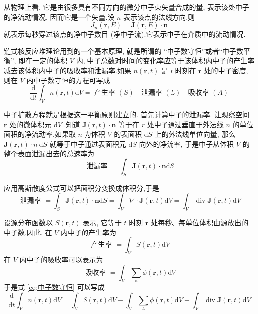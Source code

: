 \documentclass{Sichuan Normal University}
\begin{document}
从物理上看, 它是由很多具有不同方向的微分中子束矢量合成的量, 表示该处中子的净流动情况, 因而它是一个矢量.设 $n$ 表示该点的法线方向,则
\begin{equation}
    J_n(\boldsymbol{r}, E)=\boldsymbol{J}(\boldsymbol{r}, E) \cdot \boldsymbol{n}
    \label{eq:中子的净流密度2}
\end{equation}
就表示每秒穿过该点的净中子数目 (净中子流).它表示中子在介质中的流动情况.

链式核反应堆理论用到的一个基本原理, 就是所谓的 “中子数守恒”或者“中子数平衡”, 即在一定的体积 $V$ 内, 中子总数对时间的变化率应等于该体积内中子的产生率减去该体积内中子的吸收率和泄漏率.如果 $n(\boldsymbol{r}, t)$ 是 $t$ 时刻在 $\boldsymbol{r}$ 处的中子密度, 则在 $V$ 内中子数守恒的方程可写成
\begin{equation}
    \frac{\mathrm{d}}{\mathrm{d} t} \int_V n(\boldsymbol{r}, t) \mathrm{d} V=\text { 产生率 }(S) \text { - 泄漏率 }(L) \text { - 吸收率 }(A)
    \label{eq:中子数守恒}
\end{equation}

中子扩散方程就是根据这一平衡原则建立的.
首先计算中子的泄漏率.
让观察空间 $\boldsymbol{r}$ 处的微体积元 $\mathrm{d} V$ .知道 $\boldsymbol{J}(\boldsymbol{r}, t) \cdot \boldsymbol{n}$ 等于在 $r$ 处中子通过垂直于外法线 $n$ 的单位面积的净流动率.如果取 $n$ 为体积 $V$ 的表面积 $\mathrm{d} S$ 上的外法线单位向量, 那么 $\boldsymbol{J}(\boldsymbol{r}, t) \cdot n \mathrm{~d} S$ 就等于中子通过表面积元 $\mathrm{d} S$ 向外的净流率, 于是中子从体积 $V$ 的整个表面泄漏出去的总速率为
\begin{equation}
    \text { 泄漏率 }=\int_S \boldsymbol{J}(\boldsymbol{r}, t) \cdot \boldsymbol{n} \mathrm{d} S
    \label{eq:泄漏率}
\end{equation}

应用高斯散度公式可以把面积分变换成体积分,于是
\begin{equation}
    \text { 泄漏率 }=\int_S \boldsymbol{J}(\boldsymbol{r}, t) \cdot \boldsymbol{n} \mathrm{d} S=\int_V \nabla \cdot \boldsymbol{J}(\boldsymbol{r}, t) \mathrm{d} V=\int_V \operatorname{div} \boldsymbol{J}(\boldsymbol{r}, t) \mathrm{d} V
    \label{eq:泄漏率2}
\end{equation}

设源分布函数以 $S(\boldsymbol{r}, t)$ 表示, 它等于 $t$ 时刻 $\boldsymbol{r}$ 处每秒、每单位体积由源放出的中子数.因此, 在 $V$ 内中子的产生率为
\begin{equation}
    \text { 产生率 }=\int_V S(\boldsymbol{r}, t) \mathrm{d} V
    \label{eq:产生率}
\end{equation}
在 $V$ 内中子的吸收率可以表示为
\begin{equation}
    \text { 吸收率 }=\int_V \sum_{\mathrm{a}} \phi(\boldsymbol{r}, t) \mathrm{d} V
    \label{eq:吸收率}
\end{equation}
于是式 \eqref{eq:中子数守恒} 可以写成
\begin{equation}
    \frac{\mathrm{d}}{\mathrm{d} t} \int_V n(\boldsymbol{r}, t) \mathrm{d} V=\int_V S(\boldsymbol{r}, t) \mathrm{d} V-\int_V \sum_{\mathrm{a}} \phi(\boldsymbol{r}, t) \mathrm{d} V-\int_V \operatorname{div} \boldsymbol{J}(\boldsymbol{r}, t) \mathrm{d} V
    \label{eq:中子数守恒2}
\end{equation}
\end{document}
